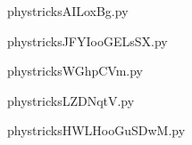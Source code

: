     

    \clearpage
    


    \newcommand{\CaptionFigAILoxBg}{<+Type your caption here+>}
    \begin{center}
        
    \end{center}
    phystricksAILoxBg.py

    

    \clearpage
    


    \newcommand{\CaptionFigJFYIooGELsSX}{<+Type your caption here+>}
    \begin{center}
        
    \end{center}
    phystricksJFYIooGELsSX.py

    

    \clearpage
    


    \newcommand{\CaptionFigWGhpCVm}{<+Type your caption here+>}
    \begin{center}
        
    \end{center}
    phystricksWGhpCVm.py

    

    \clearpage
    


    \newcommand{\CaptionFigLZDNqtV}{<+Type your caption here+>}
    \begin{center}
        
    \end{center}
    phystricksLZDNqtV.py

    

    \clearpage
    


    \newcommand{\CaptionFigHWLHooGuSDwM}{<+Type your caption here+>}
    \begin{center}
        
    \end{center}
    phystricksHWLHooGuSDwM.py

    

    \clearpage
    


